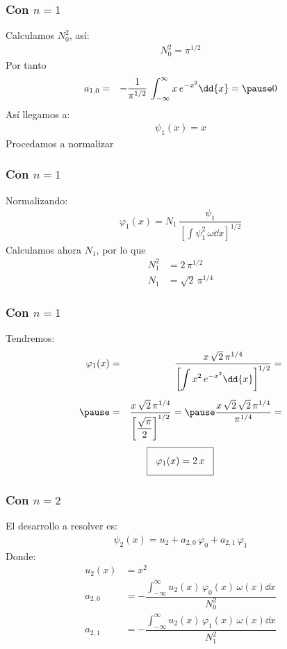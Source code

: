 \begin{frame}
\frametitle{Con $n = 1$}
Calculamos $N_{0}^{2}$, así:
\pause
\begin{align*}
N_{0}^{2} = \pi^{1/2}
\end{align*}
\pause
Por tanto
\begin{eqnarray*}
a_{1,0} &=& - \dfrac{1}{\pi^{1/2}} \, \int_{-\infty}^{\infty} x \, e^{-x^{2}} \dd{x} = \pause 0
\end{eqnarray*}
\pause
Así llegamos a:
\begin{align*}
\psi_{1} (x) = x
\end{align*}
Procedamos a normalizar
\end{frame}
\begin{frame}
\frametitle{Con $n = 1$}
Normalizando:
\begin{align*}
\varphi_{1}(x) = N_{1} \, \dfrac{\psi_{1}}{\left[ \displaystyle \int \psi_{1}^{2} \, \omega \dd{x} \right]^{1/2}}
\end{align*}
\pause
Calculamos ahora $N_{1}$, por lo que
\begin{align*}
N_{1}^{2} &= 2 \, \pi^{1/2} \\[0.5em]
N_{1} &= \sqrt{2} \, \pi^{1/4}
\end{align*}
\end{frame}
\begin{frame}
\frametitle{Con $n = 1$}
Tendremos:
\fontsize{12}{12}\selectfont
\begin{eqnarray*}
\varphi_{1}(x) &=& \dfrac{x \, \sqrt{2} \, \pi^{1/4}}{\left[ \displaystyle \int x^{2} \, e^{-x^{2}} \dd{x} \right]^{1/2}} = \\[0.5em] \pause
&=& \dfrac{x \, \sqrt{2} \, \pi^{1/4}}{ \left[ \dfrac{\sqrt{\pi}}{2} \right]^{1/2}} = \pause \dfrac{x \, \sqrt{2} \, \sqrt{2} \, \pi^{1/4}}{\pi^{1/4}} =
\end{eqnarray*}
\pause
\begin{align*}
\setlength{\fboxsep}{3\fboxsep}\boxed{
\varphi_{1}(x) = 2 \, x }
\end{align*}
\end{frame}
\begin{frame}
\frametitle{Con $n = 2$}
El desarrollo a resolver es:
\begin{align*}
\psi_{2} (x) = u_{2} + a_{2,0} \, \varphi_{0} + a_{2,1} \, \varphi_{1}
\end{align*}
\pause
Donde:
\fontsize{12}{12}\selectfont
\begin{align*}
u_{2}(x) &= x^{2} \\[0.5em]
a_{2,0} &= - \dfrac{\displaystyle \int_{-\infty}^{\infty} u_{2}(x) \, \varphi_{0}(x) \, \omega (x) \dd{x}}{N_{0}^{2}} \\[0.5em]
a_{2,1} &= - \dfrac{\displaystyle \int_{-\infty}^{\infty} u_{2}(x) \, \varphi_{1}(x) \, \omega (x) \dd{x}}{N_{1}^{2}}
\end{align*}
\end{frame}
